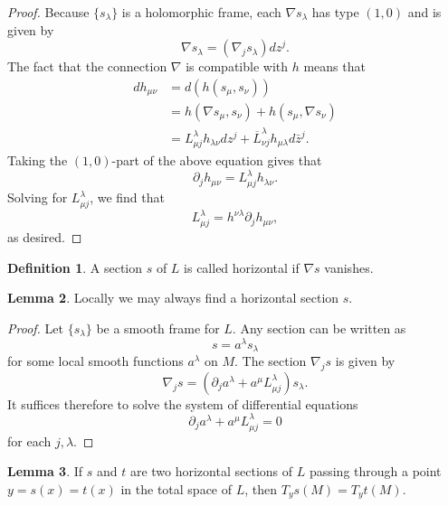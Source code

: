 \documentclass{article}
\numberwithin{equation}{section}
\theoremstyle{definition}
\newtheorem{definition}{Definition}[section]
\theoremstyle{theorem}
\newtheorem{lemma}[definition]{Lemma}
\begin{document}
\begin{proof}
Because $\{s_\lambda\}$ is a holomorphic frame, each $\nabla s_\lambda$ has type $(1,0)$ and is given by 
\[
\nabla s_\lambda = (\nabla_j s_\lambda)dz^j.
\]  The fact that the connection $\nabla$ is compatible with $h$ means that 
\begin{align*}
d h_{\mu \nu} &= d(h(s_\mu, s_\nu)) \\
&= h(\nabla s_\mu, s_\nu) + h( s_\mu, \nabla s_\nu) \\
&= L^\lambda_{\mu j} h_{\lambda \nu} dz^j + \overline{L}^{\lambda}_{\nu j} h_{\mu \lambda} d\bar{z}^j.
\end{align*}
Taking the $(1,0)$-part of the above equation gives that 
\[
\partial_j h_{\mu \nu} =  L^\lambda_{\mu j} h_{\lambda \nu}. 
\]
Solving for $L^{\lambda}_{\mu j}$, we find that 
\[
L^{\lambda}_{\mu j} = h^{\nu \lambda}\partial_j h_{\mu \nu},
\]
as desired. 
\end{proof}


\begin{definition}
A section $s$ of $L$ is called horizontal if $\nabla s$ vanishes. 
\end{definition}

\begin{lemma}
Locally we may always find a horizontal section $s$. 
\end{lemma}

\begin{proof}
Let $\{s_\lambda\}$ be a smooth frame for $L$. Any section can be written as 
\[
s = a^\lambda s_\lambda
\]
for some local smooth functions $a^\lambda$ on $M$. The section $\nabla_j s$ is given by 
\[
\nabla_j s = (\partial_j a^\lambda  + a^\mu L^\lambda_{\mu j})s_\lambda .
\]
It suffices therefore to solve the system of differential equations
\[
\partial_j a^\lambda  + a^\mu L^\lambda_{\mu j} = 0
\]
for each $j,\lambda$. 
\end{proof}



\begin{lemma}
If $s$ and $t$ are two horizontal sections of $L$ passing through a point $y = s(x) = t(x)$ in the total space of $L$, then $T_ys(M) = T_y t(M)$. 
\end{lemma}
\end{document}
